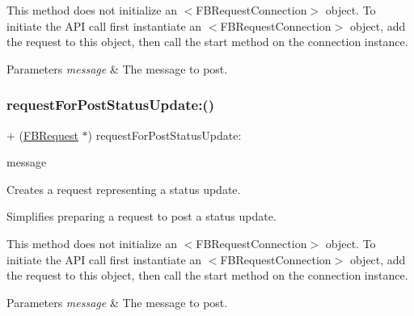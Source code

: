 This method does not initialize an $<$\+F\+B\+Request\+Connection$>$ object. To initiate the A\+PI call first instantiate an $<$\+F\+B\+Request\+Connection$>$ object, add the request to this object, then call the {\ttfamily start} method on the connection instance.


\begin{DoxyParams}{Parameters}
{\em message} & The message to post. \\
\hline
\end{DoxyParams}
\mbox{\label{interfaceFBRequest_a0a745a53f4764835bd0945bd66fe10fd}} 
\subsubsection{\texorpdfstring{request\+For\+Post\+Status\+Update\+:()}{requestForPostStatusUpdate:()}\hspace{0.1cm}{\footnotesize\ttfamily [3/5]}}
{\footnotesize\ttfamily + (\hyperlink{interfaceFBRequest}{F\+B\+Request} $\ast$) request\+For\+Post\+Status\+Update\+: \begin{DoxyParamCaption}\item[{(N\+S\+String $\ast$)}]{message }\end{DoxyParamCaption}}

Creates a request representing a status update.

Simplifies preparing a request to post a status update.

This method does not initialize an $<$\+F\+B\+Request\+Connection$>$ object. To initiate the A\+PI call first instantiate an $<$\+F\+B\+Request\+Connection$>$ object, add the request to this object, then call the {\ttfamily start} method on the connection instance.


\begin{DoxyParams}{Parameters}
{\em message} & The message to post. \\
\hline
\end{DoxyParams}
\mbox{\label{interfaceFBRequest_a0a745a53f4764835bd0945bd66fe10fd}} 
